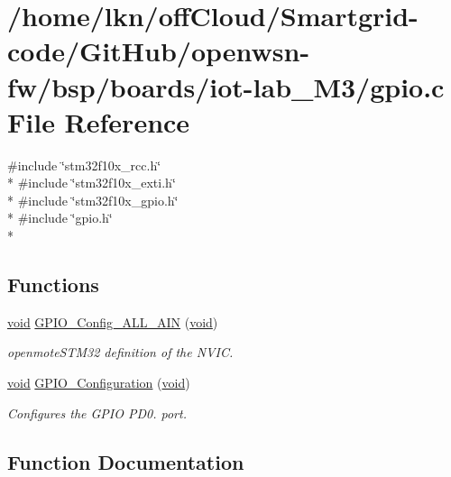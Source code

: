 \hypertarget{iot-lab___m3_2gpio_8c}{}\section{/home/lkn/off\+Cloud/\+Smartgrid-\/code/\+Git\+Hub/openwsn-\/fw/bsp/boards/iot-\/lab\+\_\+\+M3/gpio.c File Reference}
\label{iot-lab___m3_2gpio_8c}
{\ttfamily \#include \char`\"{}stm32f10x\+\_\+rcc.\+h\char`\"{}}\\*
{\ttfamily \#include \char`\"{}stm32f10x\+\_\+exti.\+h\char`\"{}}\\*
{\ttfamily \#include \char`\"{}stm32f10x\+\_\+gpio.\+h\char`\"{}}\\*
{\ttfamily \#include \char`\"{}gpio.\+h\char`\"{}}\\*
\subsection*{Functions}
\begin{DoxyCompactItemize}
\item 
\hyperlink{usb__devapi_8h_afabf60e7f57651d6d595a02c75f07cd0}{void} \hyperlink{iot-lab___m3_2gpio_8c_a500f1fb0e1c3dc284d55c05a168f8e85}{G\+P\+I\+O\+\_\+\+Config\+\_\+\+A\+L\+L\+\_\+\+A\+IN} (\hyperlink{usb__devapi_8h_afabf60e7f57651d6d595a02c75f07cd0}{void})
\begin{DoxyCompactList}\small\item\em openmote\+S\+T\+M32 definition of the N\+V\+IC. \end{DoxyCompactList}\item 
\hyperlink{usb__devapi_8h_afabf60e7f57651d6d595a02c75f07cd0}{void} \hyperlink{iot-lab___m3_2gpio_8c_a51c4d8e68afb4f1ab35691a25a46c20f}{G\+P\+I\+O\+\_\+\+Configuration} (\hyperlink{usb__devapi_8h_afabf60e7f57651d6d595a02c75f07cd0}{void})
\begin{DoxyCompactList}\small\item\em Configures the G\+P\+IO P\+D0. port. \end{DoxyCompactList}\end{DoxyCompactItemize}


\subsection{Function Documentation}
